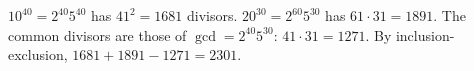 $10^{40}=2^{40}5^{40}$ has $41^2=1681$ divisors. $20^{30}=2^{60}5^{30}$ has $61\cdot31=1891$. The common divisors are those of $\gcd=2^{40}5^{30}$: $41\cdot31=1271$. By inclusion-exclusion, $1681+1891-1271=\boxed{2301}$.

